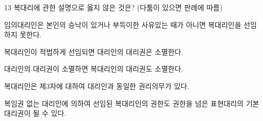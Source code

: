 \begin{question}{13}
복대리에 관한 설명으로 옳지 않은 것은? (다툼이 있으면 판례에 따름)
\begin{choices}
  \item 임의대리인은 본인의 승낙이 있거나 부득이한 사유있는 때가 아니면 복대리인을 선임하지 못한다.
  \item 복대리인이 적법하게 선임되면 대리인의 대리권은 소멸한다.
  \item 대리인의 대리권이 소멸하면 복대리인의 대리권도 소멸한다.
  \item 복대리인은 제3자에 대하여 대리인과 동일한 권리의무가 있다.
  \item 복임권 없는 대리인에 의하여 선임된 복대리인의 권한도 권한을 넘은 표현대리의 기본대리권이 될 수 있다.
\end{choices}
\end{question}
